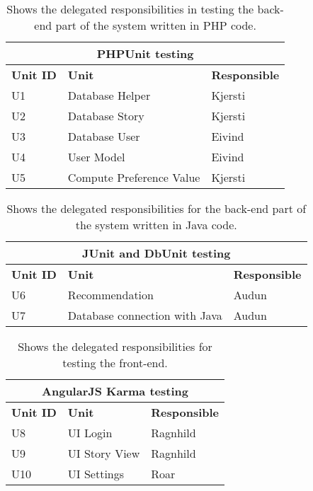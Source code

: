 \begin{table}[H]
	\caption{Shows the delegated responsibilities in testing the back-end part of the system written in PHP code.}
	\label{Tab:phptesting}
	\begin{center}
		\begin{tabular}{ | l | l | l |}
			\hline
			\multicolumn{3}{|c|}{\textbf{PHPUnit testing}} \\
			\hline
			\textbf{Unit ID} & \textbf{Unit} & \textbf{Responsible} \\ \hline
			U1 & Database Helper & Kjersti \\ \hline
			U2 & Database Story & Kjersti \\ \hline
			U3 & Database User & Eivind \\ \hline
			U4 & User Model & Eivind \\ \hline			
			U5 & Compute Preference Value & Kjersti \\ \hline			
		\end{tabular}
	\end{center}
\end{table}

\begin{table}[H]
		\caption{Shows the delegated responsibilities for the back-end part of the system written in Java code.}
		\label{Tab:junittesting}
	\begin{center}
		\begin{tabular}{ | l | l | l |}
			\hline
			\multicolumn{3}{|c|}{\textbf{JUnit and DbUnit testing}} \\
			\hline
			\textbf{Unit ID} & \textbf{Unit} & \textbf{Responsible} \\ \hline
			U6 & Recommendation  & Audun \\ \hline
			U7 & Database connection with Java & Audun \\\hline			
		\end{tabular}
	\end{center}

\end{table}

\begin{table}[H]
	\caption{Shows the delegated responsibilities for testing the front-end.}
	\label{Tab:karmatesting}
	\begin{center}
		\begin{tabular}{ | l | l | l |}
			\hline
			\multicolumn{3}{|c|}{\textbf{AngularJS Karma testing}} \\
			\hline
			\textbf{Unit ID} & \textbf{Unit} & \textbf{Responsible} \\ \hline
			U8 & UI Login & Ragnhild \\ \hline
			U9 & UI Story View & Ragnhild \\ \hline
			U10 & UI Settings & Roar \\ \hline
		\end{tabular}
	\end{center}

\end{table}


